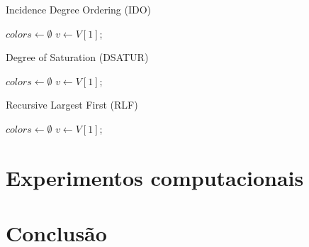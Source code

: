 \documentclass[10pt]{article}
\begin{document}
\begin{multicols*}{2}
\begin{algorithm}[H]
\caption{Incidence Degree Ordering (IDO)}
\label{alg:ido}


$colors \gets \emptyset$\;
$v \gets V[1]$;

\end{algorithm}



\begin{algorithm}[H]
\caption{Degree of Saturation (DSATUR)}
\label{alg:dsatur}


$colors \gets \emptyset$\;
$v \gets V[1]$;

\end{algorithm}



\begin{algorithm}[H]
\caption{Recursive Largest First (RLF)}
\label{alg:rlf}


$colors \gets \emptyset$\;
$v \gets V[1]$;

\end{algorithm}


\section{Experimentos computacionais}



\section{Conclusão}
\end{multicols*}
\end{document}
